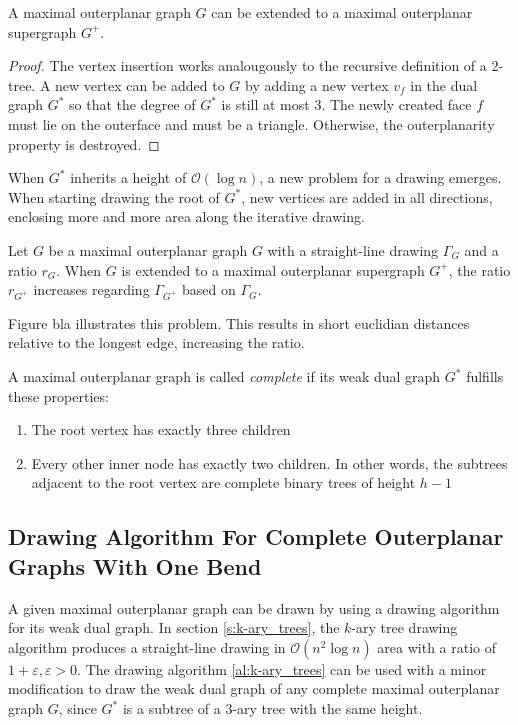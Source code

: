 \begin{lemma}
	A maximal outerplanar graph $G$ can be extended to a maximal outerplanar supergraph $G^+$.\label{l:outerplanar-supergraph}
\end{lemma}
\begin{proof}
	The vertex insertion works analougously to the recursive definition of a 2-tree. A new vertex can be added to $G$ by adding a new vertex $v_f$ in the dual graph $G^*$ so that the degree of $G^*$ is still at most 3. The newly created face $f$ must lie on the outerface and must be a triangle. Otherwise, the outerplanarity property is destroyed. 
\end{proof}

When $G^*$ inherits a height of $\mathcal{O}(\log n)$, a new problem for a drawing emerges. When starting drawing the root of $G^*$, new vertices are added in all directions, enclosing more and more area along the iterative drawing. 
\begin{observation}
	Let $G$ be a maximal outerplanar graph $G$ with a straight-line drawing $\Gamma_G$ and a ratio $r_G$. When $G$ is extended to a maximal outerplanar supergraph $G^+$, the ratio $r_{G^+}$ increases regarding $\Gamma_{G^+}$ based on $\Gamma_G$.
\end{observation}
Figure bla illustrates this problem. 
This results in short euclidian distances relative to the longest edge, increasing the ratio.\\
\begin{definition}\label{def:complete_maximal_outerplanar}
	A maximal outerplanar graph is called \emph{complete} if its weak dual graph $G^*$ fulfills these properties:
	\begin{enumerate}
		\item The root vertex has exactly three children
		\item Every other inner node has exactly two children. In other words, the subtrees adjacent to the root vertex are complete binary trees of height $h-1$
	\end{enumerate}
\end{definition}

\subsection{Drawing Algorithm For Complete Outerplanar Graphs With One Bend}

A given maximal outerplanar graph can be drawn by using a drawing algorithm for its weak dual graph. In section \ref{s:k-ary_trees}, the $k$-ary tree drawing algorithm produces a straight-line drawing in $\mathcal{O}(n^2 \log n)$ area with a ratio of $1+\varepsilon,\varepsilon>0$. The drawing algorithm \ref{al:k-ary_trees} can be used with a minor modification to draw the weak dual graph of any complete maximal outerplanar graph $G$, since $G^*$ is a subtree of a $3$-ary tree with the same height.\\


